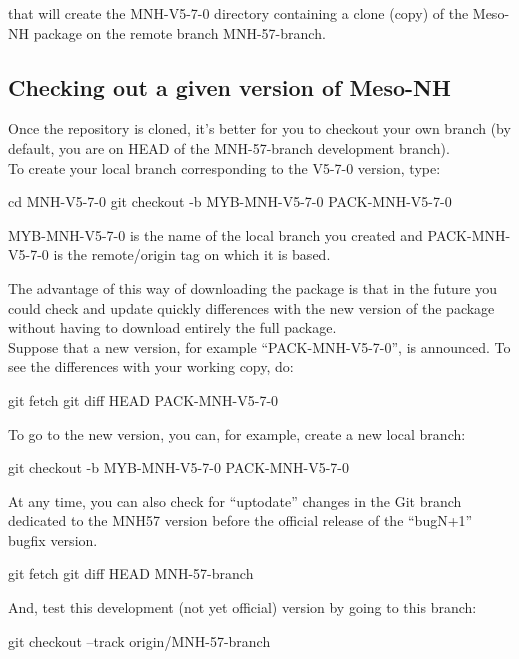 that will create the MNH-V5-7-0 directory containing a clone (copy) of the Meso-NH package on the remote branch MNH-57-branch.

\subsection{Checking out a given version of Meso-NH}

Once the repository is cloned, it's better for you to checkout your own branch (by default, you are on HEAD of the MNH-57-branch development branch). \\

To create your local branch corresponding to the V5-7-0 version, type:
\begin{bashcode}
cd MNH-V5-7-0
git checkout -b MYB-MNH-V5-7-0 PACK-MNH-V5-7-0
\end{bashcode}

MYB-MNH-V5-7-0 is the name of the local branch you created and PACK-MNH-V5-7-0 is the remote/origin tag on which it is based.

The advantage of this way of downloading the package is that in the future you could check and update quickly differences with the new version of the package without having to download entirely the full package. \\

Suppose that a new version, for example ``PACK-MNH-V5-7-0'', is announced. To see the differences with your working copy, do:
\begin{bashcode}
git fetch
git diff HEAD PACK-MNH-V5-7-0
\end{bashcode}

To go to the new version, you can, for example, create a new local branch:
\begin{bashcode}
git checkout -b MYB-MNH-V5-7-0 PACK-MNH-V5-7-0
\end{bashcode}

At any time, you can also check for ``uptodate'' changes in the Git branch dedicated to the MNH57 version before the official release of the ``bugN+1'' bugfix version.
\begin{bashcode}
git fetch
git diff HEAD MNH-57-branch
\end{bashcode}

And, test this development (not yet official) version by going to this branch:
\begin{bashcode}
git checkout --track origin/MNH-57-branch
\end{bashcode}

